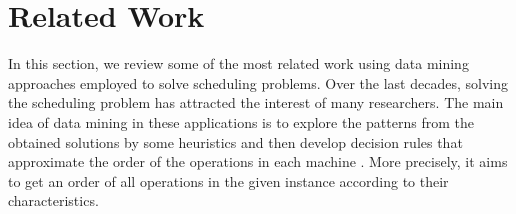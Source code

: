 \documentclass[runningheads]{llncs}
\begin{document}

\section{Related Work}
\label{sec:literature}
In this section, we review some of the most related work using data mining approaches employed to solve scheduling problems. Over the last decades, solving the scheduling problem has attracted the interest of many researchers. The main idea of data mining in these applications is to explore the patterns from the obtained solutions by some heuristics and then develop decision rules that approximate the order of the operations in each machine \cite{ismail2012production}. More precisely, it aims to get an order of all operations in the given instance according to their characteristics.
\end{document}
